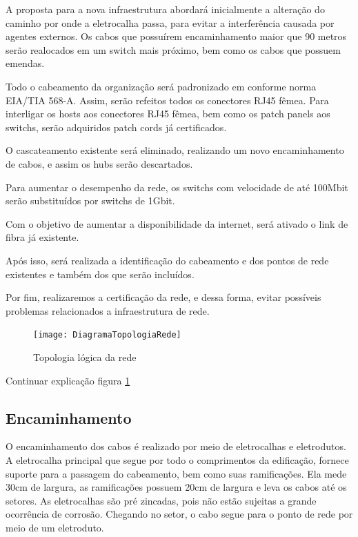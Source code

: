 \documentclass[	DIV=calc,%
							paper=a4,%
							fontsize=12pt,%
							onecolumn]{scrartcl}	 					%
\begin{document}
A proposta para a nova infraestrutura abordará inicialmente a alteração do caminho por onde a eletrocalha passa, para evitar a interferência causada por agentes externos. Os cabos que possuírem encaminhamento maior que 90 metros serão realocados em um switch mais próximo, bem como os cabos que possuem emendas.

Todo o cabeamento da organização será padronizado em conforme norma EIA/TIA 568-A. Assim, serão refeitos todos os conectores RJ45 fêmea. Para interligar os hosts aos conectores RJ45 fêmea, bem como os patch panels aos switchs, serão adquiridos patch cords já certificados.

O cascateamento existente será eliminado, realizando um novo encaminhamento de cabos, e assim os hubs serão descartados.

Para aumentar o desempenho da rede, os switchs com velocidade de até 100Mbit serão substituídos por switchs de 1Gbit.

Com o objetivo de aumentar a disponibilidade da internet, será ativado o link de fibra já existente.

Após isso, será realizada a identificação do cabeamento e dos pontos de rede existentes e também dos que serão incluídos.

Por fim, realizaremos a certificação da rede, e dessa forma, evitar possíveis problemas relacionados a infraestrutura de rede.





\begin{figure}[h!]
	\centering
	\texttt{[image: DiagramaTopologiaRede]}
	\caption{Topologia lógica da rede}
	\label{DiagramaTopologiaRede}
\end{figure}


Continuar explicação figura \ref{DiagramaTopologiaRede}

\subsection{Encaminhamento}



O encaminhamento dos cabos é realizado por meio de eletrocalhas e eletrodutos. A eletrocalha principal que segue por todo o comprimentos da edificação, fornece suporte para a passagem do cabeamento, bem como suas ramificações. Ela mede 30cm de largura, as ramificações possuem 20cm de largura e leva os cabos até os setores. As eletrocalhas são pré zincadas, pois não estão sujeitas a grande ocorrência de corrosão. Chegando no setor, o cabo segue para o ponto de rede por meio de um eletroduto.
\end{document}
